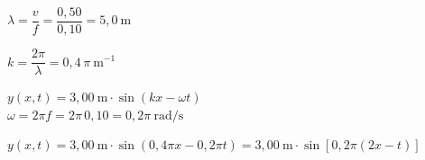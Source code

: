 \begin{solapartat}
 $\lambda = \dfrac{v}{f} = \dfrac{0,50}{0,10} = 5,0\ \mathrm{m}$

 $k = \dfrac{2\pi}{\lambda} = 0,4\,\pi\ \mathrm{m^{-1}}$
\end{solapartat}

\begin{solapartat}
$y(x, t) = 3,00\ \mathrm{m}\cdot\sin(kx - \omega t)$\\
 $\omega = 2\pi f = 2\pi\, 0,10 = 0,2\pi\ \mathrm{rad/s}$

 $y(x, t) = 3,00\ \mathrm{m}\cdot\sin(0,4\pi x - 0,2\pi t) = 3,00\ \mathrm{m}\cdot\sin\left[0,2\pi(2x - t)\right]$
\end{solapartat}
